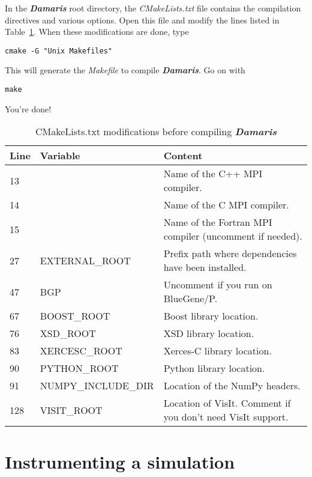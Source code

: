 \documentclass[11pt]{report}
\newcommand{\Damaris}{\emph{\textbf{Damaris}}}
\newcommand{\file}[1]{\emph{#1}}
\begin{document}
In the \Damaris{} root directory, the \file{CMakeLists.txt} file contains the compilation directives
and various options. Open this file and modify the lines listed in Table~\ref{tab:cmake}.
When these modifications are done, type
\begin{verbatim}
cmake -G "Unix Makefiles"
\end{verbatim}
This will generate the \file{Makefile} to compile \Damaris{}. Go on with 
\begin{verbatim}
make
\end{verbatim}
You're done!

\begin{table}
\centering
\begin{tabular}{|l|l|l|}
	\hline
   Line & Variable & Content \\
   \hline
   \hline
   13 &  & Name of the C++ MPI compiler. \\
   14 &  & Name of the C MPI compiler. \\
   15 &  & Name of the Fortran MPI compiler (uncomment if needed). \\
   27 & EXTERNAL\_ROOT & Prefix path where dependencies have been installed. \\
   47 & BGP & Uncomment if you run on BlueGene/P. \\
   67 & BOOST\_ROOT & Boost library location. \\
   76 & XSD\_ROOT & XSD library location. \\
   83 & XERCESC\_ROOT & Xerces-C library location. \\
   90 & PYTHON\_ROOT & Python library location. \\
   91 & NUMPY\_INCLUDE\_DIR & Location of the NumPy headers. \\
   128 & VISIT\_ROOT & Location of VisIt. Comment if you don't need VisIt support. \\
   \hline
\end{tabular}\caption{CMakeLists.txt modifications before compiling \Damaris{}}\label{tab:cmake}
\end{table}



\chapter{Instrumenting a simulation}\label{Instrumenting}
\end{document}
